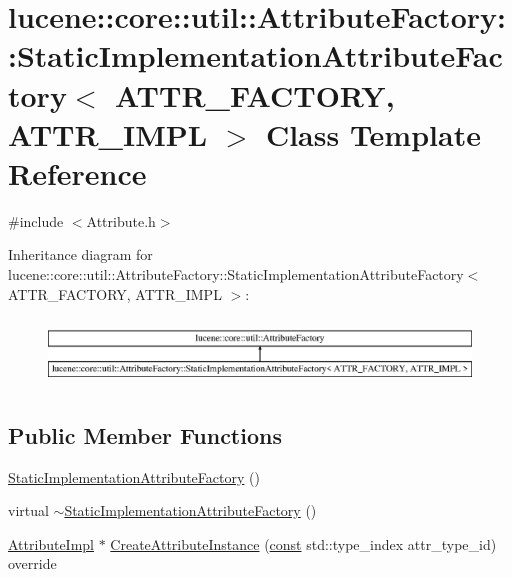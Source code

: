 \hypertarget{classlucene_1_1core_1_1util_1_1AttributeFactory_1_1StaticImplementationAttributeFactory}{}\section{lucene\+:\+:core\+:\+:util\+:\+:Attribute\+Factory\+:\+:Static\+Implementation\+Attribute\+Factory$<$ A\+T\+T\+R\+\_\+\+F\+A\+C\+T\+O\+RY, A\+T\+T\+R\+\_\+\+I\+M\+PL $>$ Class Template Reference}
\label{classlucene_1_1core_1_1util_1_1AttributeFactory_1_1StaticImplementationAttributeFactory}


{\ttfamily \#include $<$Attribute.\+h$>$}

Inheritance diagram for lucene\+:\+:core\+:\+:util\+:\+:Attribute\+Factory\+:\+:Static\+Implementation\+Attribute\+Factory$<$ A\+T\+T\+R\+\_\+\+F\+A\+C\+T\+O\+RY, A\+T\+T\+R\+\_\+\+I\+M\+PL $>$\+:\begin{figure}[H]
\begin{center}
\leavevmode
\includegraphics[height=1.815235cm]{classlucene_1_1core_1_1util_1_1AttributeFactory_1_1StaticImplementationAttributeFactory}
\end{center}
\end{figure}
\subsection*{Public Member Functions}
\begin{DoxyCompactItemize}
\item 
\mbox{\hyperlink{classlucene_1_1core_1_1util_1_1AttributeFactory_1_1StaticImplementationAttributeFactory_aed1692d943f8a70e46a85a739743ae94}{Static\+Implementation\+Attribute\+Factory}} ()
\item 
virtual \mbox{\hyperlink{classlucene_1_1core_1_1util_1_1AttributeFactory_1_1StaticImplementationAttributeFactory_a5f8394a6ae54e7aed546e0b8f40ce400}{$\sim$\+Static\+Implementation\+Attribute\+Factory}} ()
\item 
\mbox{\hyperlink{classlucene_1_1core_1_1util_1_1AttributeImpl}{Attribute\+Impl}} $\ast$ \mbox{\hyperlink{classlucene_1_1core_1_1util_1_1AttributeFactory_1_1StaticImplementationAttributeFactory_a06466469f2cf37e0ef599e617d415c6a}{Create\+Attribute\+Instance}} (\mbox{\hyperlink{ZlibCrc32_8h_a2c212835823e3c54a8ab6d95c652660e}{const}} std\+::type\+\_\+index attr\+\_\+type\+\_\+id) override
\end{DoxyCompactItemize}
